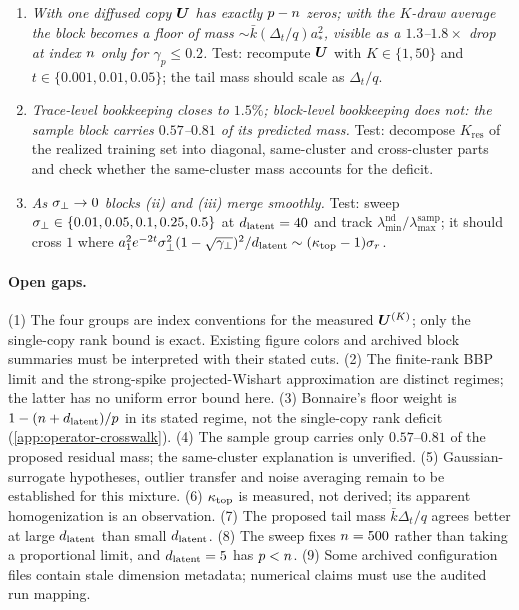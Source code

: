 \begin{enumerate}
\item \emph{With one diffused copy $\bm{U}$ has exactly $p-n$ zeros; with the $K$-draw average the block becomes a floor of mass $\sim\bar k(\Delta_t/q)a_*^2$, visible as a $1.3$--$1.8\times$ drop at index $n$ only for $\gamma_p\le0.2$.} Test: recompute $\bm{U}$ with $K\in\{1,50\}$ and $t\in\{0.001,0.01,0.05\}$; the tail mass should scale as $\Delta_t/q$.
\item \emph{Trace-level bookkeeping closes to $1.5\%$; block-level bookkeeping does not: the sample block carries $0.57$--$0.81$ of its predicted mass.} Test: decompose $K_{\mathrm{res}}$ of the realized training set into diagonal, same-cluster and cross-cluster parts and check whether the same-cluster mass accounts for the deficit.
\item \emph{As $\sigma_{\perp}\to0$ blocks (ii) and (iii) merge smoothly.} Test: sweep $\sigma_{\perp}\in\{0.01,0.05,0.1,0.25,0.5\}$ at $d_{\mathrm{latent}}=40$ and track $\lambda^{\mathrm{nd}}_{\min}/\lambda^{\mathrm{samp}}_{\max}$; it should cross $1$ where $a_1^2e^{-2t}\sigma_{\perp}^2(1-\sqrt{\gamma_\perp})^2/d_{\mathrm{latent}}\sim(\kappa_{\mathrm{top}}-1)\sigma_r$.
\end{enumerate}

\paragraph{Open gaps.}
(1) The four groups are index conventions for the measured $\bm{U}^{(K)}$; only the single-copy rank bound is exact. Existing figure colors and archived block summaries must be interpreted with their stated cuts. (2) The finite-rank BBP limit and the strong-spike projected-Wishart approximation are distinct regimes; the latter has no uniform error bound here. (3) Bonnaire's floor weight is $1-(n+d_{\mathrm{latent}})/p$ in its stated regime, not the single-copy rank deficit (\cref{app:operator-crosswalk}). (4) The sample group carries only $0.57$--$0.81$ of the proposed residual mass; the same-cluster explanation is unverified. (5) Gaussian-surrogate hypotheses, outlier transfer and noise averaging remain to be established for this mixture. (6) $\kappa_{\rm top}$ is measured, not derived; its apparent homogenization is an observation. (7) The proposed tail mass $\bar k\Delta_t/q$ agrees better at large $d_{\mathrm{latent}}$ than small $d_{\mathrm{latent}}$. (8) The sweep fixes $n=500$ rather than taking a proportional limit, and $d_{\mathrm{latent}}=5$ has $p<n$. (9) Some archived configuration files contain stale dimension metadata; numerical claims must use the audited run mapping.


